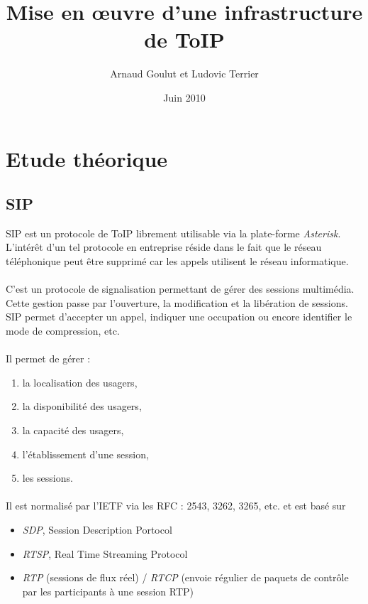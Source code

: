 \documentclass[12pt,a4paper,notitlepage]{article}
\begin{document}
\title{Mise en \oe uvre d'une infrastructure de ToIP}
\author{Arnaud Goulut et Ludovic Terrier}
\date{Juin 2010}
\maketitle



\thispagestyle{empty}


 
\section{Etude théorique}
\subsection{SIP}
SIP est un protocole de ToIP librement utilisable via la plate-forme \textit{Asterisk}. L'intérêt d'un tel protocole en entreprise réside dans le fait que le réseau téléphonique peut être supprimé car les appels utilisent le réseau informatique.  

\paragraph{}C'est un protocole de signalisation permettant de gérer des sessions multimédia. Cette gestion passe par l'ouverture, la modification et la libération de sessions. SIP permet d'accepter un appel, indiquer une occupation ou encore identifier le mode de compression, etc. 


\paragraph{}Il permet de gérer :
\begin{enumerate}
\item la localisation des usagers,
\item la disponibilité des usagers,
\item la capacité des usagers,
\item l'établissement d'une session,
\item les sessions.
\end{enumerate}

\paragraph{}Il est normalisé par l'IETF via les RFC : 2543, 3262, 3265, etc. et est basé sur 
\begin{itemize}
\item \textit{SDP}, Session Description Portocol
\item \textit{RTSP}, Real Time Streaming Protocol 
\item \textit{RTP} (sessions de flux réel) / \textit{RTCP} (envoie régulier de paquets de contrôle par les participants à une session RTP)
\end{itemize} 
\end{document}
